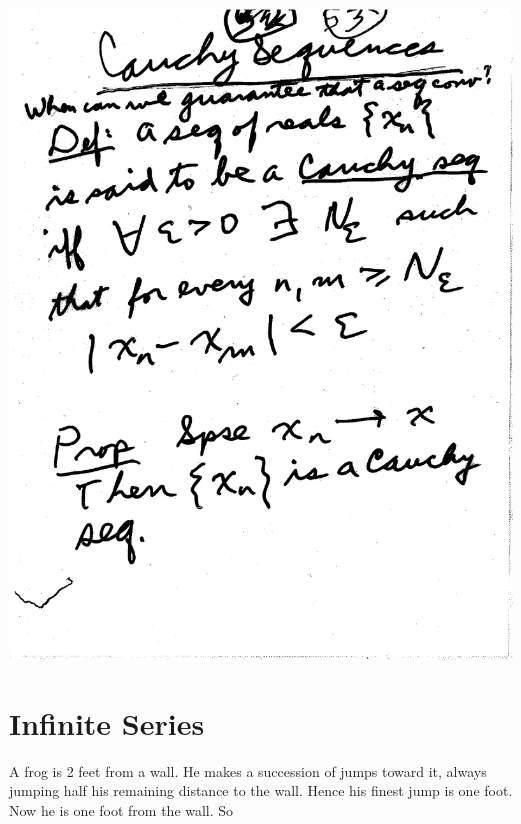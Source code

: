 \documentclass[10pt,a4paper]{article}
\begin{document}
{{\includegraphics[scale=.5]{Pages/LC_10}

\newpage
\section{Infinite Series}

A frog is 2 feet from a wall. He makes a succession of jumps toward it, always jumping half his remaining distance to the wall. Hence his finest jump is one foot. Now he is one foot from the wall. So

}}
\end{document}
